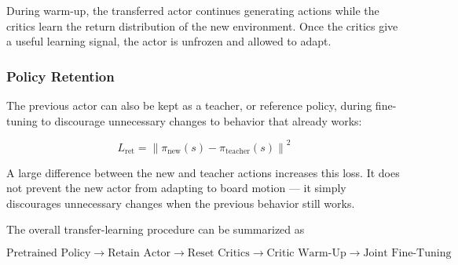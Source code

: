 \documentclass[9pt]{extarticle}
\begin{document}
\begin{center}
\end{center}

During warm-up, the transferred actor continues generating actions while
the critics learn the return distribution of the new environment. Once the
critics give a useful learning signal, the actor is unfrozen and allowed to
adapt.

\subsubsection{Policy Retention}

The previous actor can also be kept as a teacher, or reference policy,
during fine-tuning to discourage unnecessary changes to behavior that
already works:

\begin{equation}
\boxed{
L_{\mathrm{ret}}
=
\left\|
\pi_{\mathrm{new}}(s)
-
\pi_{\mathrm{teacher}}(s)
\right\|^2
}
\label{eq:retention_loss}
\end{equation}

A large difference between the new and teacher actions increases this
loss. It does not prevent the new actor from adapting to board motion — it
simply discourages unnecessary changes when the previous behavior still
works.

The overall transfer-learning procedure can be summarized as

\begin{equation}
\boxed{
\text{Pretrained Policy}
\rightarrow
\text{Retain Actor}
\rightarrow
\text{Reset Critics}
\rightarrow
\text{Critic Warm-Up}
\rightarrow
\text{Joint Fine-Tuning}
}
\end{equation}
\end{document}
